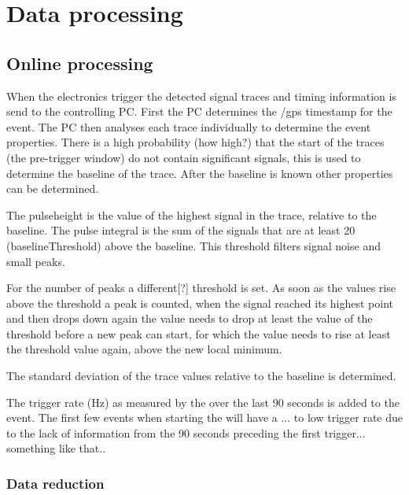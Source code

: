 \chapter{Data processing}
\label{ch:data_processing}

\section{Online processing}

When the \hisparc electronics trigger the detected signal traces and timing information is send to the controlling PC. First the PC determines the /gps timestamp for the event. The PC then analyses each trace individually to determine the event properties. There is a high probability (how high?) that the start of the traces (the pre-trigger window) do not contain significant signals, this is used to determine the baseline of the trace. After the baseline is known other properties can be determined.

The pulseheight is the value of the highest signal in the trace, relative to the baseline. The pulse integral is the sum of the signals that are at least \SI{20}{\adc} (baselineThreshold) above the baseline. This threshold filters signal noise and small peaks.

For the number of peaks a different[?] threshold is set. As soon as the values rise above the threshold a peak is counted, when the signal reached its highest point and then drops down again the value needs to drop at least the value of the threshold before a new peak can start, for which the value needs to rise at least the threshold value again, above the new local minimum.

The standard deviation of the trace values relative to the baseline is determined.

The trigger rate (Hz) as measured by the \daq over the last 90 seconds is added to the event. The first few events when starting the \daq will have a ... to low trigger rate due to the lack of information from the 90 seconds preceding the first trigger... something like that..


\subsection{Data reduction}

